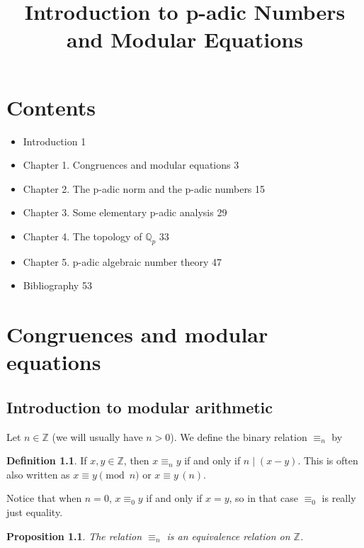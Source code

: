 \documentclass[11pt]{book}
\title{Introduction to p-adic Numbers and Modular Equations}
\author{}
\date{}
\theoremstyle{plain}
\newtheorem{proposition}[theorem]{Proposition}
\theoremstyle{definition}
\newtheorem{definition}[theorem]{Definition}
\begin{document}
\maketitle

\tableofcontents

\chapter*{Contents}

\begin{itemize}
    \item Introduction \hfill 1
    \item Chapter 1. Congruences and modular equations \hfill 3
    \item Chapter 2. The p-adic norm and the p-adic numbers \hfill 15
    \item Chapter 3. Some elementary p-adic analysis \hfill 29
    \item Chapter 4. The topology of $\mathbb{Q}_p$ \hfill 33
    \item Chapter 5. p-adic algebraic number theory \hfill 47
    \item Bibliography \hfill 53
\end{itemize}

\chapter{Congruences and modular equations}

\section*{Introduction to modular arithmetic}

Let $n \in \mathbb{Z}$ (we will usually have $n > 0$). We define the binary relation $\equiv_n$ by

\begin{definition}
If $x, y \in \mathbb{Z}$, then $x \equiv_n y$ if and only if $n \mid (x - y)$. This is often also written as $x \equiv y \pmod{n}$ or $x \equiv y \, (n)$.
\end{definition}

Notice that when $n = 0$, $x \equiv_0 y$ if and only if $x = y$, so in that case $\equiv_0$ is really just equality.

\begin{proposition}
The relation $\equiv_n$ is an equivalence relation on $\mathbb{Z}$.
\end{proposition}
\end{document}
